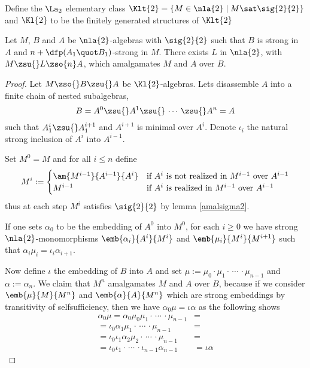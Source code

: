 Define the $\La_{2}$ elementary
class $\Klt{2}=\left\{
M\in\nla{2}\mid M\sat\sig{2}{2}\right\}$ and
$\Kl{2}$ to be the finitely generated structures of $\Klt{2}$
\begin{lem}\label{asymalgadue}
Let $M$, $B$ and $A$ be $\nla{2}$-algebras with $\sig{2}{2}$ such that $B$ is strong in $A$ and $n+\dfp(A_{1}\quot B_{1})$-strong in $M$. There exists $L$ in $\nla{2}$, with $M\zsu{}L\zso{n}A$, which amalgamates
$M$ and $A$ over $B$.
\end{lem}
\begin{proof}\cbstart
Let $M\zso{} B\zsu{} A$ be $\Kl{2}$-algebras.
Lets disassemble $A$ into a finite chain of nested subalgebras,
$$B=A^{0}\zsu{}A^{1}\zsu{}\,\cdots\,\zsu{} A^{n}=A$$
such that $A_{1}^{i}\zsu{}A_{1}^{i+1}$ and $A^{i+1}$ is minimal over $A^{i}$. Denote
$\iota_{i}$ the natural strong inclusion of $A^{i}$ into $A^{i-1}$.

Set $M^{0}=M$ and for all $i\leq n$ %
define
$$
M^{i}:=
\begin{cases}
\am{M^{i-1}}{A^{i-1}}{A^{i}}&\text{if $A^{i}$ is not realized in $M^{i-1}$ over $A^{i-1}$}\\
M^{i-1}&\text{if $A^{i}$ is realized in $M^{i-1}$ over $A^{i-1}$}
\end{cases}
$$
thus at each step $M^{i}$ satisfies $\sig{2}{2}$ by lemma \ref{amalsigma2}.

If one sets $\alpha_{0}$ to be the embedding of $A^{0}$ into $M^{0}$,
for each $i\geq0$ we have strong $\nla{2}$-monomorphisms
$\emb{\alpha_{i}}{A^{i}}{M^{i}}$ and $\emb{\mu_{i}}{M^{i}}{M^{i+1}}$
such that $\alpha_{i}\mu_{i}=\iota_{i}\alpha_{i+1}$.

Now define $\iota$ the embedding of $B$ into $A$ and set 
$\mu:=\mu_{0}\cdot\mu_{1}\cdot\,\cdots\,\cdot\mu_{n-1}$
and $\alpha:=\alpha_{n}$. We claim that $M^{n}$ amalgamates
$M$ and $A$ over $B$, because if we consider $\emb{\mu}{M}{M^{n}}$ and $\emb{\alpha}{A}{M^{n}}$ which
are strong embeddings by transitivity of selfsufficiency,
then we have $\alpha_{0}\mu=\iota\alpha$ as the following shows
\begin{align*}
\alpha_{0}\mu=\alpha_{0}\mu_{0}\mu_{1}\cdot\,\cdots\,\cdot\mu_{n-1}&=\\
=\iota_{0}\alpha_{1}\mu_{1}\cdot\,\cdots\,\cdot\mu_{n-1}&=\\
=\iota_{0}\iota_{1}\alpha_{2}\mu_{2}\cdot\,\cdots\,\cdot\mu_{n-1}&=\\
=\iota_{0}\iota_{1}\cdot\,\cdots\,\cdot\iota_{n-1}\alpha_{n-1}&=\iota\alpha
\end{align*}
\end{proof}\cbend
